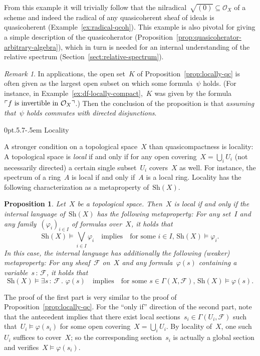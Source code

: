 \documentclass[10pt,reqno,a4paper]{amsbook}
\makeatletter
\theoremstyle{definition}
\theoremstyle{plain}
\newtheorem{prop}[defn]{Proposition}
\theoremstyle{remark}
\newtheorem{rem}[defn]{Remark}
\newcommand{\F}{\mathcal{F}}
\renewcommand{\O}{\mathcal{O}}
\newcommand{\Sh}{\mathrm{Sh}}
\newcommand{\?}{\,{:}\,}
\renewcommand{\_}{\mathpunct{.}\,}
\newcommand{\speak}[1]{\ulcorner\text{\textnormal{#1}}\urcorner}
\renewenvironment{proof}[1][\proofname]{\par
  \pushQED{\qed}%
  \normalfont \topsep6\p@\@plus6\p@\relax
  \trivlist
  \item[\hskip\labelsep
        \itshape
    #1\@addpunct{.}]\ignorespaces
}{%
  \popQED\endtrivlist\@endpefalse
}
\def\subsection{\@startsection{subsection}{2}%
  {0pt}{.5\linespacing\@plus.7\linespacing}{-.5em}%
  {\normalfont\bfseries}}
\makeatother
\begin{document}
From this example it will trivially follow that the nilradical~$\sqrt{(0)}
\subseteq \O_X$ of a scheme and indeed the radical of any quasicoherent
sheaf of ideals is quasicoherent (Example~\ref{ex:radical-qcoh}). This example is also
pivotal for giving a simple description of the quasicoherator
(Proposition~\ref{prop:quasicoherator-arbitrary-algebra}), which in turn is
needed for an internal understanding of the relative
spectrum (Section~\ref{sect:relative-spectrum}).

\begin{rem}In applications, the open set~$K$ of Proposition~\ref{prop:locally-qc} is often given
as the largest open subset on which some formula~$\psi$ holds. (For instance,
in Example~\ref{ex:df-locally-compact},~$K$ was given by the formula~$\speak{$f$
is invertible in $\O_X$}$.)
Then the conclusion of the proposition is that \emph{assuming that~$\psi$ holds commutes
with directed disjunctions}.\end{rem}


\subsection{Locality}

A stronger condition on a topological space~$X$ than quasicompactness is
locality: A topological space is \emph{local} if and only if for any open
covering~$X = \bigcup_i U_i$ (not necessarily directed) a certain single subset~$U_i$
covers~$X$ as well. For instance, the spectrum of a ring~$A$ is local if and only
if~$A$ is a local ring. Locality has the following characterization as a metaproperty
of~$\Sh(X)$.

\begin{prop}\label{prop:local-meta}Let~$X$ be a topological space. Then~$X$ is local if and
only if the internal language of~$\Sh(X)$ has the following metaproperty:
For any set~$I$ and any family~$(\varphi_i)_{i \in I}$ of
formulas over~$X$, it holds that
\[ \Sh(X) \models \bigvee_{i \in I} \varphi_i
  \quad\text{implies}\quad
  \text{for some~$i \in I$, $\Sh(X) \models \varphi_i$}. \]
In this case, the internal language has additionally the following (weaker) metaproperty: For any
sheaf~$\F$ on~$X$ and any formula~$\varphi(s)$ containing a variable~$s\?\F$,
it holds that
\[ \Sh(X) \models \exists s\?\F\_ \varphi(s)
  \quad\text{implies}\quad
  \text{for some~$s \in \Gamma(X,\F)$, $\Sh(X) \models \varphi(s)$}. \]
\end{prop}
\begin{proof}The proof of the first part is very similar to the proof of
Proposition~\ref{prop:locally-qc}. For the ``only if'' direction of the second part, note
that the antecedent implies that there exist local sections~$s_i \in
\Gamma(U_i,\F)$ such that~$U_i \models \varphi(s_i)$ for some open covering~$X
= \bigcup_i U_i$. By locality of~$X$, one such~$U_i$ suffices to cover~$X$; so
the corresponding section~$s_i$ is actually a global section and verifies~$X
\models \varphi(s_i)$.
\end{proof}
\end{document}
